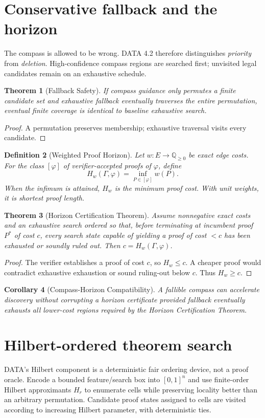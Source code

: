 \documentclass[11pt]{article}
\newtheorem{theorem}{Theorem}[section]\newtheorem{corollary}[theorem]{Corollary}\newtheorem{proposition}[theorem]{Proposition}\newtheorem{conjecture}[theorem]{Conjecture}\newtheorem{definition}[theorem]{Definition}\newtheorem{remark}[theorem]{Remark}
\begin{document}
\section{Conservative fallback and the horizon}
The compass is allowed to be wrong. DATA 4.2 therefore distinguishes \emph{priority} from \emph{deletion}. High-confidence compass regions are searched first; unvisited legal candidates remain on an exhaustive schedule.
\begin{theorem}[Fallback Safety]If compass guidance only permutes a finite candidate set and exhaustive fallback eventually traverses the entire permutation, eventual finite coverage is identical to baseline exhaustive search.\end{theorem}
\begin{proof}A permutation preserves membership; exhaustive traversal visits every candidate.\end{proof}
\begin{definition}[Weighted Proof Horizon]Let $w:E\to\mathbb Q_{\ge0}$ be exact edge costs. For the class $[\varphi]$ of verifier-accepted proofs of $\varphi$, define \[H_w(\Gamma,\varphi)=\inf_{P\in[\varphi]}w(P).\] When the infimum is attained, $H_w$ is the minimum proof cost. With unit weights, it is shortest proof length.\end{definition}
\begin{theorem}[Horizon Certification Theorem]Assume nonnegative exact costs and an exhaustive search ordered so that, before terminating at incumbent proof $P^*$ of cost $c$, every search state capable of yielding a proof of cost $<c$ has been exhausted or soundly ruled out. Then $c=H_w(\Gamma,\varphi)$.\end{theorem}
\begin{proof}The verifier establishes a proof of cost $c$, so $H_w\le c$. A cheaper proof would contradict exhaustive exhaustion or sound ruling-out below $c$. Thus $H_w\ge c$.\end{proof}
\begin{corollary}[Compass-Horizon Compatibility]A fallible compass can accelerate discovery without corrupting a horizon certificate provided fallback eventually exhausts all lower-cost regions required by the Horizon Certification Theorem.\end{corollary}
\section{Hilbert-ordered theorem search}
DATA's Hilbert component is a deterministic fair ordering device, not a proof oracle. Encode a bounded feature/search box into $[0,1]^n$ and use finite-order Hilbert approximants $H_r$ to enumerate cells while preserving locality better than an arbitrary permutation. Candidate proof states assigned to cells are visited according to increasing Hilbert parameter, with deterministic ties.
\end{document}

